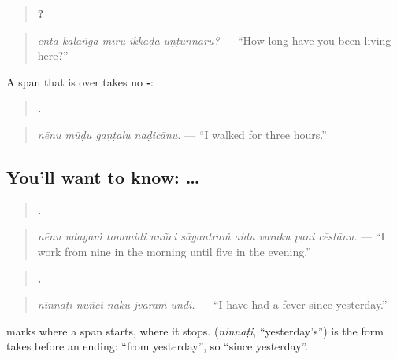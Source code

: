 \begin{quote}
\textbf{    ?}
\end{quote}

\begin{quote}
\emph{enta kālaṅgā mīru ikkaḍa uṇṭunnāru?} — \textquotedblleft{}How long have you been living here?\textquotedblright{}
\end{quote}

A span that is over takes no \textbf{-}:

\begin{quote}
\textbf{   .}
\end{quote}

\begin{quote}
\emph{nēnu mūḍu gaṇṭalu naḍicānu.} — \textquotedblleft{}I walked for three hours.\textquotedblright{}
\end{quote}

\subsection*{You'll want to know:  … }
\begin{quote}
\textbf{        .}
\end{quote}

\begin{quote}
\emph{nēnu udayaṁ tommidi nuñci sāyantraṁ aidu varaku pani cēstānu.} — \textquotedblleft{}I work from nine in the morning until five in the evening.\textquotedblright{}
\end{quote}

\begin{quote}
\textbf{    .}
\end{quote}

\begin{quote}
\emph{ninnaṭi nuñci nāku jvaraṁ undi.} — \textquotedblleft{}I have had a fever since yesterday.\textquotedblright{}
\end{quote}

\textbf{} marks where a span starts, \textbf{} where it stops. \textbf{} (\emph{ninnaṭi}, \textquotedblleft{}yesterday's\textquotedblright{}) is the form \textbf{} takes before an ending: \textquotedblleft{}from yesterday\textquotedblright{}, so \textquotedblleft{}since yesterday\textquotedblright{}.

